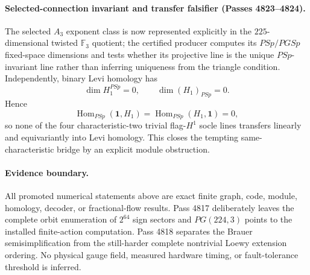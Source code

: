 \paragraph{Selected-connection invariant and transfer falsifier (Passes 4823--4824).}
The selected $A_3$ exponent class is now represented explicitly in the $225$-dimensional twisted $\mathbb F_3$ quotient; the certified producer computes its $PSp/PGSp$ fixed-space dimensions and tests whether its projective line is the unique $PSp$-invariant line rather than inferring uniqueness from the triangle condition.  Independently, binary Levi homology has
\[
\dim H_1^{PSp}=0,\qquad \dim (H_1)_{PSp}=0.
\]
Hence
\[
\operatorname{Hom}_{PSp}(\mathbf 1,H_1)=
\operatorname{Hom}_{PSp}(H_1,\mathbf 1)=0,
\]
so none of the four characteristic-two trivial flag-$H^1$ socle lines transfers linearly and equivariantly into Levi homology.  This closes the tempting same-characteristic bridge by an explicit module obstruction.

\paragraph{Evidence boundary.}
All promoted numerical statements above are exact finite graph, code, module, homology, decoder, or fractional-flow results.  Pass 4817 deliberately leaves the complete orbit enumeration of $2^{64}$ sign sectors and $PG(224,3)$ points to the installed finite-action computation.  Pass 4818 separates the Brauer semisimplification from the still-harder complete nontrivial Loewy extension ordering.  No physical gauge field, measured hardware timing, or fault-tolerance threshold is inferred.
